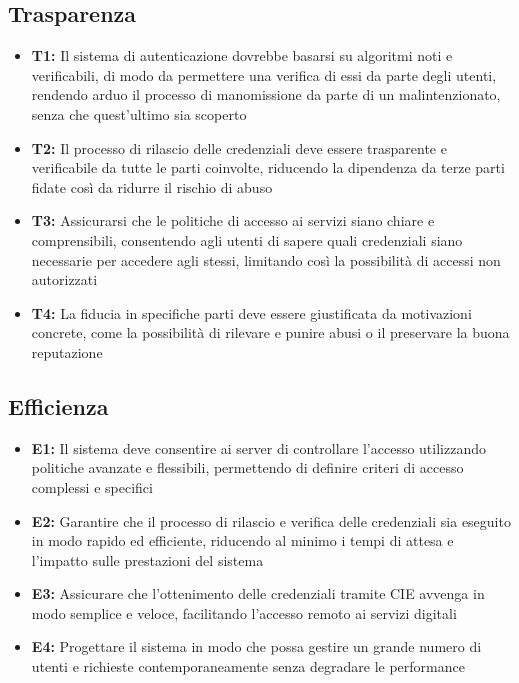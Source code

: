         \subsection{Trasparenza}
            \begin{itemize}
                \item \textbf{T1:} Il sistema di autenticazione dovrebbe basarsi su algoritmi noti e verificabili, di modo da permettere una verifica di essi da parte degli utenti, rendendo arduo il processo di manomissione da parte di un malintenzionato, senza che quest'ultimo sia scoperto
            
                \item \textbf{T2:} Il processo di rilascio delle credenziali deve essere trasparente e verificabile da tutte le parti coinvolte, riducendo la dipendenza da terze parti fidate così da ridurre il rischio di abuso   
                
                \item \textbf{T3:} Assicurarsi che le politiche di accesso ai servizi siano chiare e comprensibili, consentendo agli utenti di sapere quali credenziali siano necessarie per accedere agli stessi, limitando così la possibilità di accessi non autorizzati
    
                \item \textbf{T4:} La fiducia in specifiche parti deve essere giustificata da motivazioni concrete, come la possibilità di rilevare e punire abusi o il preservare la buona reputazione
            \end{itemize}
    
        \subsection{Efficienza}
            \begin{itemize}
                \item \textbf{E1:} Il sistema deve consentire ai server di controllare l'accesso utilizzando politiche avanzate e flessibili, permettendo di definire criteri di accesso complessi e specifici
                
                \item \textbf{E2:} Garantire che il processo di rilascio e verifica delle credenziali sia eseguito in modo rapido ed efficiente, riducendo al minimo i tempi di attesa e l'impatto sulle prestazioni del sistema
                
                \item \textbf{E3:} Assicurare che l'ottenimento delle credenziali tramite CIE avvenga in modo semplice e veloce, facilitando l'accesso remoto ai servizi digitali
    
                \item \textbf{E4:} Progettare il sistema in modo che possa gestire un grande numero di utenti e richieste contemporaneamente senza degradare le performance
            \end{itemize}
    
